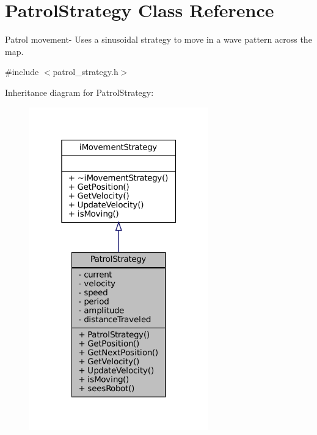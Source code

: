 \hypertarget{classPatrolStrategy}{}\section{Patrol\+Strategy Class Reference}
\label{classPatrolStrategy}


Patrol movement-\/ Uses a sinusoidal strategy to move in a wave pattern across the map.  




{\ttfamily \#include $<$patrol\+\_\+strategy.\+h$>$}



Inheritance diagram for Patrol\+Strategy\+:\nopagebreak
\begin{figure}[H]
\begin{center}
\leavevmode
\includegraphics[width=220pt]{classPatrolStrategy__inherit__graph}
\end{center}
\end{figure}


